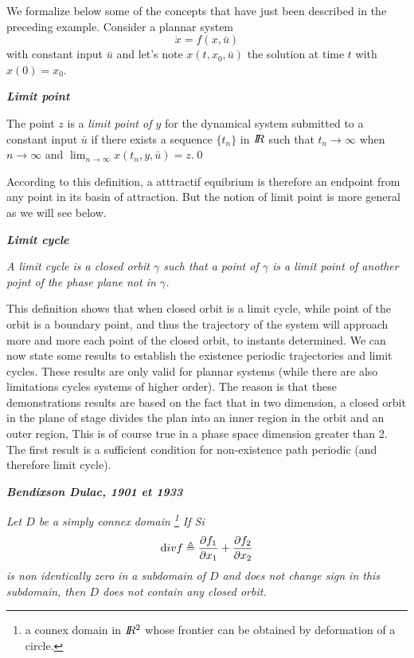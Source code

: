 {We formalize below some of the concepts that have just been
described in the preceding example. Consider a plannar system $$\dot x=f(x,\bar u)$$ 
with constant input $\bar u$ and let's note $x(t,x_0,\bar u)$ the solution at time $t$ with $x(0)=x_0$.

\begin{definition}{\bf\em Limit point}

The point $z$ is a {\em limit point of $y$} for the dynamical system submitted to a constant input $\bar u$
if there exists a sequence $\{t_n\}$ in
$I \! \! R$ such that $t_n \rightarrow \infty$ when $n \rightarrow \infty$ and
$\lim_{n\rightarrow \infty} x(t_n,y,\bar u)=z$.\qed
\end{definition}

According to this definition, a atttractif equibrium is therefore an endpoint
from any point in its basin of attraction. But the notion of limit point is more
general as we will see below.

\begin{definition}{\bf \em Limit cycle}

{\em A {\em limit cycle} is a closed orbit $\gamma$ such that a point of $\gamma$ is a limit point of another pojnt of the phase plane not in 
$\gamma$.}\cqfd\end{definition}

This definition shows that when closed orbit is a limit cycle, while
point of the orbit is a boundary point, and thus the trajectory of the system
will approach more and more each point of the closed orbit, to
instants determined.
We can now state some results to establish the existence
periodic trajectories and limit cycles. These results are only valid
for plannar systems (while there are also limitations cycles
systems of higher order). The reason is that these demonstrations
results are based on the fact that in two dimension, a closed orbit in the plane of
stage divides the plan into an inner region in the orbit and an outer region,
This is of course true in a phase space dimension greater than
2. The first result is a sufficient condition for non-existence path
periodic (and therefore limit cycle).

\begin{theoreme} {\bf \em Bendixson Dulac, 1901 et 1933} 

{\em Let $D$ be a simply connex domain \footnote{a connex domain in  $I \! \! R^2$ whose frontier can be obtained by deformation of a circle.}
If Si $${\mbox div}f \triangleq \frac{\partial f_1}{\partial
x_1}+\frac{\partial f_2}{\partial x_2}$$ is non identically zero in a subdomain of $D$ and does not change sign in this subdomain,
then $D$ does not contain any closed orbit.}\cqfd\end{theoreme}

}
